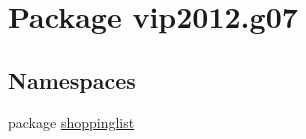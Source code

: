 \hypertarget{namespacevip2012_1_1g07}{\section{Package vip2012.\-g07}
\label{namespacevip2012_1_1g07}
}
\subsection*{Namespaces}
\begin{DoxyCompactItemize}
\item 
package \hyperlink{namespacevip2012_1_1g07_1_1shoppinglist}{shoppinglist}
\end{DoxyCompactItemize}

